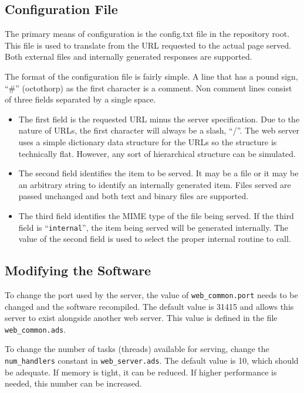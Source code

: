\documentclass[10pt, openany, draft]{article}
\begin{document}
\subsection{Configuration File}
The primary means of configuration is the config.txt file in the repository root.  This file is used to translate from the URL requested to the actual page served.  Both external files and internally generated responses are supported.

The format of the configuration file is fairly simple.  A line that has a pound sign, ``\#'' (octothorp) as the first character is a comment.  Non comment lines consist of three fields separated by a single space.
\begin{itemize}
  \item The first field is the requested URL minus the server specification.  Due to the nature of URLs, the first character will always be a slash, ``/''.  The web server uses a simple dictionary data structure for the URLs so the structure is technically flat.  However, any sort of hierarchical structure can be simulated.
  \item The second field identifies the item to be served.  It may be a file or it may be an arbitrary string to identify an internally generated item.  Files served are passed unchanged and both text and binary files are supported.
  \item The third field identifies the MIME type of the file being served.  If the third field is ``\texttt{internal}'', the item being served will be generated internally.  The value of the second field is used to select the proper internal routine to call.
\end{itemize}

\subsection{Modifying the Software}
To change the port used by the server, the value of \texttt{web\_common.port} needs to be changed and the software recompiled.  The default value is 31415 and allows this server to exist alongside another web server.  This value is defined in the file \texttt{web\_common.ads}.

To change the number of tasks (threads) available for serving, change the \texttt{num\_handlers} constant in \texttt{web\_server.ads}.  The default value is 10, which should be adequate.  If memory is tight, it can be reduced. If higher performance is needed, this number can be increased.
\end{document}
